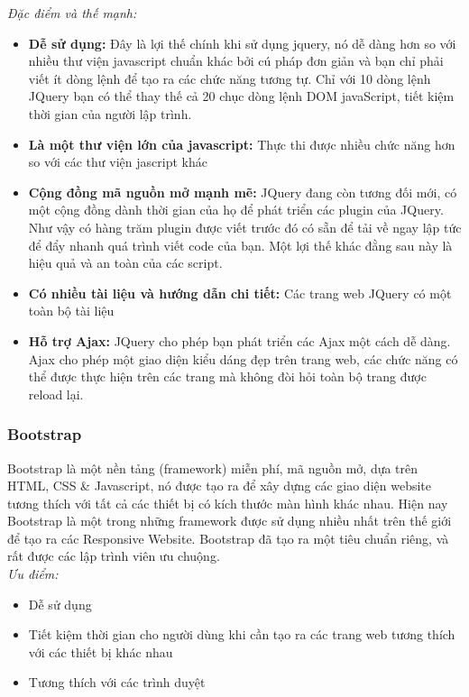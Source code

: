 \textit{Đặc điểm và thế mạnh:}
\begin{itemize}
    \item \textbf{Dễ sử dụng:} Đây là lợi thế chính khi sử dụng jquery, nó dễ dàng hơn so với nhiều thư viện javascript chuẩn khác bởi cú pháp đơn giản và bạn chỉ phải viết ít dòng lệnh để tạo ra các chức năng tương tự. Chỉ với 10 dòng lệnh JQuery bạn có thể thay thế cả 20 chục dòng lệnh DOM javaScript, tiết kiệm thời gian của người lập trình.
    \item \textbf{Là một thư viện lớn của javascript:} Thực thi được nhiều chức năng hơn so với các thư viện jascript khác
    \item \textbf{Cộng đồng mã nguồn mở mạnh mẽ:} JQuery đang còn tương đối mới, có một cộng đồng dành thời gian của họ để phát triển các plugin của JQuery. Như vậy có hàng trăm plugin được viết trước đó có sẵn để tải về ngay lập tức để đẩy nhanh quá trình viết code của bạn. Một lợi thế khác đằng sau này là hiệu quả và an toàn của các script.
    \item \textbf{Có nhiều tài liệu và hướng dẫn chi tiết:} Các trang web JQuery có một toàn bộ tài liệu
    \item \textbf{Hỗ trợ Ajax:} JQuery cho phép bạn phát triển các Ajax một cách dễ dàng. Ajax cho phép một giao diện kiểu dáng đẹp trên trang web, các chức năng có thể được thực hiện trên các trang mà không đòi hỏi toàn bộ trang được reload lại.
\end{itemize}
\subsubsection{Bootstrap}
Bootstrap là một nền tảng (framework) miễn phí, mã nguồn mở, dựa trên HTML, CSS & Javascript, nó được tạo ra để xây dựng các giao diện website tương thích với tất cả các thiết bị có kích thước màn hình khác nhau.
Hiện nay Bootstrap là một trong những framework được sử dụng nhiều nhất trên thế giới để tạo ra các Responsive Website. Bootstrap đã tạo ra một tiêu chuẩn riêng, và rất được các lập trình viên ưu chuộng.\\

\textit{Ưu điểm:}
\begin{itemize}
    \item Dễ sử dụng
    \item Tiết kiệm thời gian cho người dùng khi cần tạo ra các trang web tương thích với các thiết bị khác nhau
    \item Tương thích với các trình duyệt
\end{itemize}


